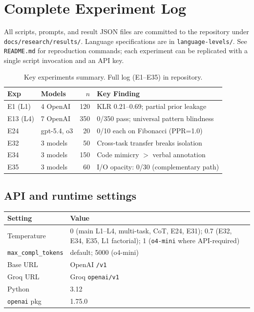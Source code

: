 \section{Complete Experiment Log}

All scripts, prompts, and result JSON files are committed to the repository under \texttt{docs/research/results/}. Language specifications are in \texttt{language-levels/}. See \texttt{README.md} for reproduction commands; each experiment can be replicated with a single script invocation and an API key.

\begin{table}[h]
\centering
\caption{Key experiments summary. Full log (E1--E35) in repository.}
\label{tab:exp_summary}
\footnotesize
\begin{tabular}{@{}llrl@{}}
\toprule
\textbf{Exp} & \textbf{Models} & \textbf{$n$} & \textbf{Key Finding} \\
\midrule
E1 (L1) & 4 OpenAI & 120 & KLR 0.21--0.69; partial prior leakage \\
E13 (L4) & 7 OpenAI & 350 & 0/350 pass; universal pattern blindness \\
E24 & gpt-5.4, o3 & 20 & 0/10 each on Fibonacci (PPR=1.0) \\
E32 & 3 models & 50 & Cross-task transfer breaks isolation \\
E34 & 3 models & 150 & Code mimicry $>$ verbal annotation \\
E35 & 3 models & 60 & I/O opacity: 0/30 (complementary path) \\
\bottomrule
\end{tabular}
\end{table}

\subsection{API and runtime settings}

\footnotesize
\begin{tabular}{@{}lp{4cm}@{}}
\toprule
Setting & Value \\
\midrule
Temperature & 0 (main L1--L4, multi-task, CoT, E24, E31); 0.7 (E32, E34, E35, L1 factorial); 1 (\texttt{o4-mini} where API-required) \\
\texttt{max\_compl\_tokens} & default; 5000 (o4-mini) \\
Base URL & OpenAI \texttt{/v1} \\
Groq URL & Groq \texttt{openai/v1} \\
Python & 3.12 \\
\texttt{openai} pkg & 1.75.0 \\
\bottomrule
\end{tabular}
\normalsize
